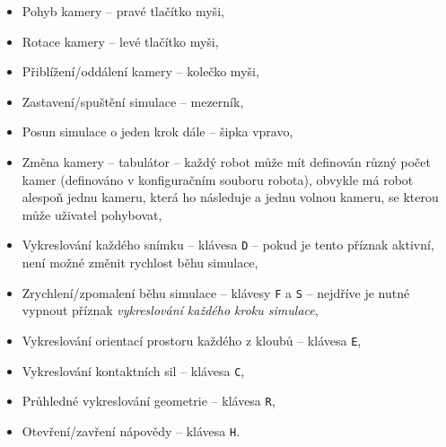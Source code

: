 \begin{itemize} \label{doc_23_seasoning_mujoco_controls}
    \item Pohyb kamery -- pravé tlačítko myši,
    \item Rotace kamery -- levé tlačítko myši,
    \item Přiblížení/oddálení kamery -- kolečko myši,
    \item Zastavení/spuštění simulace -- mezerník,
    \item Posun simulace o jeden krok dále -- šipka vpravo,
    \item Změna kamery -- tabulátor -- každý robot může mít definován různý počet
        kamer (definováno v konfiguračním souboru robota), obvykle má robot
        alespoň jednu kameru, která ho následuje a jednu volnou kameru, se
        kterou může uživatel pohybovat,
    \item Vykreslování každého snímku -- klávesa \texttt{D} -- pokud je tento
        příznak aktivní, není možné změnit rychlost běhu simulace,
    \item Zrychlení/zpomalení běhu simulace -- klávesy \texttt{F} a \texttt{S}
        -- nejdříve je nutné vypnout příznak \emph{vykreslování každého kroku
        simulace},
    \item Vykreslování orientací prostoru každého z kloubů -- klávesa \texttt{E},
    \item Vykreslování kontaktních sil -- klávesa \texttt{C},
    \item Průhledné vykreslování geometrie -- klávesa \texttt{R},
    \item Otevření/zavření nápovědy -- klávesa \texttt{H}.
\end{itemize}

